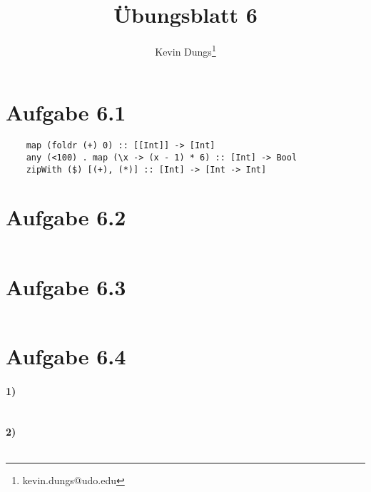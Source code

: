 \documentclass[a4paper]{scrartcl}
\title{Übungsblatt 6}
\author{Kevin Dungs\thanks{kevin.dungs@udo.edu}}
\begin{document}
\maketitle

\section*{Aufgabe 6.1}
\begin{verbatim}
    map (foldr (+) 0) :: [[Int]] -> [Int]
    any (<100) . map (\x -> (x - 1) * 6) :: [Int] -> Bool
    zipWith ($) [(+), (*)] :: [Int] -> [Int -> Int]
\end{verbatim}

\section*{Aufgabe 6.2}
\inputminted{haskell}{lists.hs}

\section*{Aufgabe 6.3}
\inputminted{haskell}{folds.hs}

\section*{Aufgabe 6.4}
\paragraph{1)}
\inputminted{haskell}{pytriples.hs}
\paragraph{2)}
\inputminted{haskell}{mirp.hs}
\end{document}

